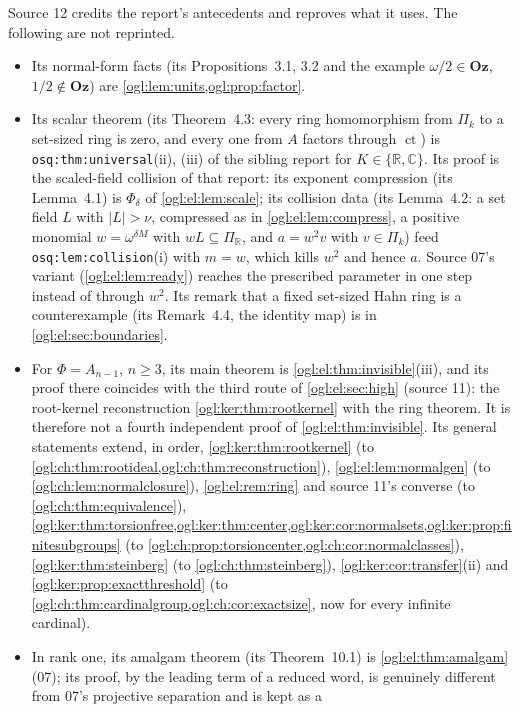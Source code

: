 \documentclass[11pt,oneside]{article}
\numberwithin{equation}{section}
\theoremstyle{definition}
\theoremstyle{remark}
\newcommand{\Oz}{\mathbf{Oz}}
\newcommand{\R}{\mathbb R}
\newcommand{\C}{\mathbb C}
\newcommand{\ct}{\operatorname{ct}}
\newcommand{\replabel}[1]{\nolinkurl{#1}}
\begin{document}
Source 12 credits the report's antecedents and reproves what it uses. The
following are not reprinted.
\begin{itemize}[leftmargin=*]
\item Its normal-form facts (its Propositions~3.1, 3.2 and the example
$\omega/2\in\Oz$, $1/2\notin\Oz$) are \cref{ogl:lem:units,ogl:prop:factor}.
\item Its scalar theorem (its Theorem~4.3: every ring homomorphism from $\Pi_k$
to a set-sized ring is zero, and every one from $A$ factors through $\ct$) is
\replabel{osq:thm:universal}(ii), (iii) of the sibling report for $K\in\{\R,\C\}$.
Its proof is the scaled-field collision of that report: its exponent
compression (its Lemma~4.1) is $\Phi_\delta$ of \cref{ogl:el:lem:scale}; its
collision data (its Lemma~4.2: a set field $L$ with $|L|>\nu$, compressed as in
\cref{ogl:el:lem:compress}, a positive monomial $w=\omega^{\delta M}$ with
$wL\subseteq\Pi_\R$, and $a=w^2v$ with $v\in\Pi_k$) feed
\replabel{osq:lem:collision}(i) with $m=w$, which kills $w^2$ and hence $a$.
Source 07's variant (\cref{ogl:el:lem:ready}) reaches the prescribed parameter
in one step instead of through $w^2$. Its remark that a
fixed set-sized Hahn ring is a counterexample (its Remark~4.4, the identity
map) is in \cref{ogl:el:sec:boundaries}.
\item For $\Phi=A_{n-1}$, $n\ge3$, its main theorem is
\cref{ogl:el:thm:invisible}(iii), and its proof there coincides with the third
route of \cref{ogl:el:sec:high} (source 11): the root-kernel reconstruction
\cref{ogl:ker:thm:rootkernel} with the ring theorem. It is therefore not a
fourth independent proof of \cref{ogl:el:thm:invisible}. Its general
statements extend, in order, \cref{ogl:ker:thm:rootkernel} (to
\cref{ogl:ch:thm:rootideal,ogl:ch:thm:reconstruction}),
\cref{ogl:el:lem:normalgen} (to \cref{ogl:ch:lem:normalclosure}),
\cref{ogl:el:rem:ring} and source 11's converse (to
\cref{ogl:ch:thm:equivalence}), \cref{ogl:ker:thm:torsionfree,ogl:ker:thm:center,ogl:ker:cor:normalsets,ogl:ker:prop:finitesubgroups}
(to \cref{ogl:ch:prop:torsioncenter,ogl:ch:cor:normalclasses}),
\cref{ogl:ker:thm:steinberg} (to \cref{ogl:ch:thm:steinberg}),
\cref{ogl:ker:cor:transfer}(ii) and \cref{ogl:ker:prop:exactthreshold} (to
\cref{ogl:ch:thm:cardinalgroup,ogl:ch:cor:exactsize}, now for every infinite
cardinal).
\item In rank one, its amalgam theorem (its Theorem~10.1) is
\cref{ogl:el:thm:amalgam} (07); its proof, by the leading term of a reduced
word, is genuinely different from 07's projective separation and is kept as a

\end{itemize}
\end{document}
